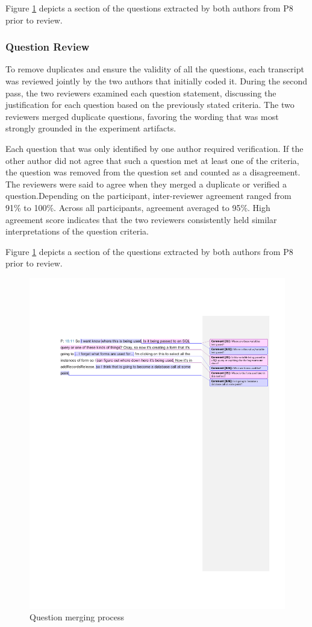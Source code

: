\documentclass[conference]{IEEEtran}
\begin{document}
Figure \ref{fig:merging} depicts a section of the questions extracted by both authors from P8 prior to review.
\subsubsection{Question Review}
To remove duplicates and ensure the validity of all the questions, each transcript was reviewed jointly by the two authors that initially coded it.
During the second pass, the two reviewers examined each question statement, discussing the justification for each question based on the previously stated criteria.
The two reviewers merged duplicate questions, favoring the wording that was most strongly grounded in the experiment artifacts.

Each question that was only identified by one author required verification.
If the other author did not agree that such a question met at least one of the criteria, the question was removed from the question set and counted as a disagreement.
The reviewers were said to agree when they merged a duplicate or verified a question.Depending on the participant, inter-reviewer agreement ranged from 91\% to 100\%. Across all participants, agreement averaged to 95\%.
High agreement score indicates that the two reviewers consistently held similar interpretations of the question criteria.


Figure \ref{fig:merging} depicts a section of the questions extracted by both authors from P8 prior to review.

\begin{figure}
\centering
\includegraphics[width=7.5in]{Images/QuestionMerging}
\caption{Question merging process}
\label{fig:merging} 
\end{figure}
\end{document}
